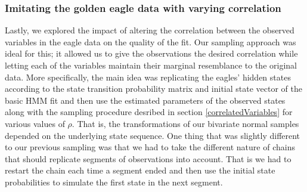 \subsubsection{Imitating the golden eagle data with varying correlation}\label{eagleImitation}
Lastly, we explored the impact of altering the correlation between the observed variables in the eagle data on the quality of the fit. Our sampling approach was ideal for this; it allowed us to give the observations the desired correlation while letting each of the variables maintain their marginal resemblance to the original data. More specifically, the main idea was replicating the eagles' hidden states according to the state transition probability matrix and initial state vector of the basic HMM fit and then use the estimated parameters of the observed states along with the sampling procedure desribed in section \ref{correlatedVariables} for various values of $\rho$. That is, the transformations of our bivariate normal samples depended on the underlying state sequence. One thing that was slightly different to our previous sampling was that we had to take the different nature of chains that should replicate segments of observations into account. That is we had to restart the chain each time a segment ended and then use the initial state probabilities to simulate the first state in the next segment.